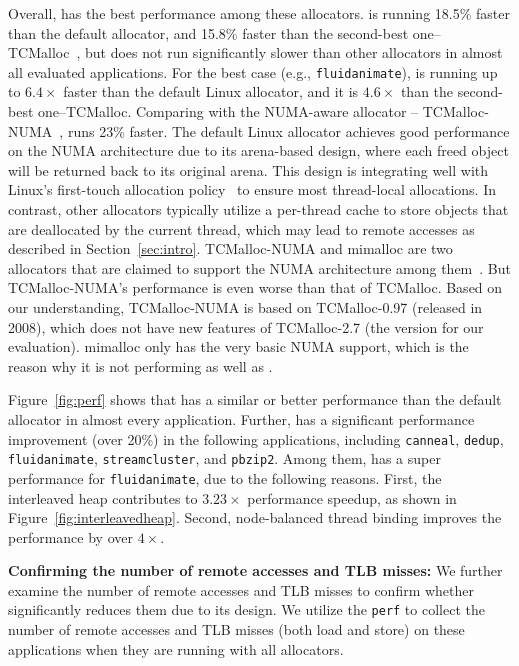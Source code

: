 Overall, \NM{} has the best performance among these allocators. \NM{} is running 18.5\% faster than the default allocator, and 15.8\% faster than the second-best one--TCMalloc~\cite{tcmalloc}, but does not run significantly slower than other allocators in almost all evaluated applications. For the best case (e.g., \texttt{fluidanimate}), \NM{} is running up to $6.4\times$ faster than the default Linux allocator, and it is $4.6\times$ than the second-best one--TCMalloc.  Comparing with the NUMA-aware allocator -- TCMalloc-NUMA~\cite{tcmallocnew}, \NM{} runs 23\% faster. The default Linux allocator achieves good performance on the NUMA architecture due to its arena-based design, where each freed object will be returned back to its original arena.
This design is integrating well with Linux's first-touch allocation policy~\cite{Lameter:2013:NO:2508834.2513149} to ensure most thread-local allocations. 
In contrast, other allocators typically utilize a per-thread cache to store objects that are deallocated by the current thread, which may lead to remote accesses as described in Section~\ref{sec:intro}.  TCMalloc-NUMA and mimalloc are two allocators that are claimed to support the NUMA architecture among them~\cite{tcmallocnew}. But TCMalloc-NUMA's performance is even worse than that of TCMalloc. Based on our understanding, TCMalloc-NUMA is based on TCMalloc-0.97 (released in 2008), which does not have new features of TCMalloc-2.7 (the version for our evaluation). mimalloc only has the very basic NUMA support, which is the reason why it is not performing as well as \NM{}.  


Figure~\ref{fig:perf} shows that \NM{} has a similar or better performance than the default allocator in almost every application. Further, \NM{} has a significant performance improvement (over 20\%) in the following applications, including \texttt{canneal}, \texttt{dedup}, \texttt{fluidanimate}, \texttt{streamcluster}, and \texttt{pbzip2}. Among them, \NM{} has a super performance for \texttt{fluidanimate}, due to the following reasons. First, the interleaved heap contributes to $3.23\times$ performance speedup, as shown in Figure~\ref{fig:interleavedheap}. Second, node-balanced thread binding improves the performance by over $4\times$. 

\textbf{Confirming the number of remote accesses and TLB misses:} We further examine the number of remote accesses and TLB misses to confirm whether \NM{} significantly reduces them due to its design. We utilize the \texttt{perf} to collect the number of remote accesses and TLB misses (both load and store) on these applications when they are running with all allocators. 

